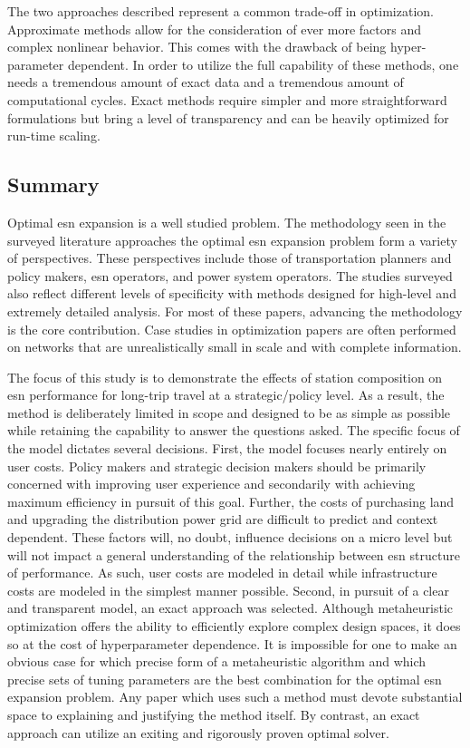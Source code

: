 The two approaches described represent a common trade-off in optimization. Approximate methods allow for the consideration of ever more factors and complex nonlinear behavior. This comes with the drawback of being hyper-parameter dependent. In order to utilize the full capability of these methods, one needs a tremendous amount of exact data and a tremendous amount of computational cycles. Exact methods require simpler and more straightforward formulations but bring a level of transparency and can be heavily optimized for run-time scaling.

\subsection{Summary}

Optimal \gls{esn} expansion is a well studied problem. The methodology seen in the surveyed literature approaches the optimal \gls{esn} expansion problem form a variety of perspectives. These perspectives include those of transportation planners and policy makers, \gls{esn} operators, and power system operators. The studies surveyed also reflect different levels of specificity with methods designed for high-level and extremely detailed analysis. For most of these papers, advancing the methodology is the core contribution. Case studies in optimization papers are often performed on networks that are unrealistically small in scale and with complete information.

The focus of this study is to demonstrate the effects of station composition on \gls{esn} performance for long-trip travel at a strategic/policy level. As a result, the method is deliberately limited in scope and designed to be as simple as possible while retaining the capability to answer the questions asked. The specific focus of the model dictates several decisions. First, the model focuses nearly entirely on user costs. Policy makers and strategic decision makers should be primarily concerned with improving user experience and secondarily with achieving maximum efficiency in pursuit of this goal. Further, the costs of purchasing land and upgrading the distribution power grid are difficult to predict and context dependent. These factors will, no doubt, influence decisions on a micro level but will not impact a general understanding of the relationship between \gls{esn} structure of performance. As such, user costs are modeled in detail while infrastructure costs are modeled in the simplest manner possible. Second, in pursuit of a clear and transparent model, an exact approach was selected. Although metaheuristic optimization offers the ability to efficiently explore complex design spaces, it does so at the cost of hyperparameter dependence. It is impossible for one to make an obvious case for which precise form of a metaheuristic algorithm and which precise sets of tuning parameters are the best combination for the optimal \gls{esn} expansion problem. Any paper which uses such a method must devote substantial space to explaining and justifying the method itself. By contrast, an exact approach can utilize an exiting and rigorously proven optimal solver.

